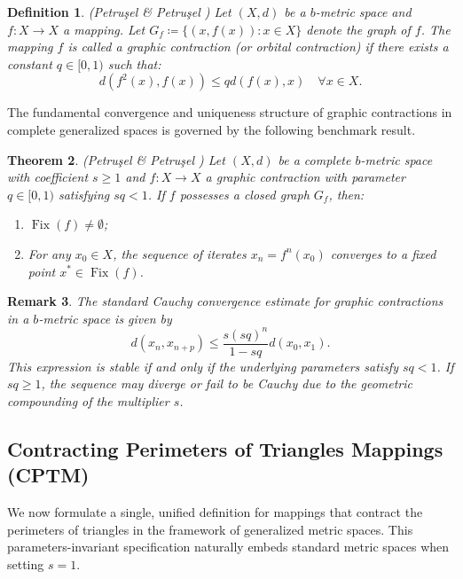 \documentclass[a4paper,12pt,oneside]{article}
\newtheorem{theorem}{Theorem}[section]
\newtheorem{definition}[theorem]{Definition}
\newtheorem{remark}[theorem]{Remark}
\numberwithin{equation}{section}
\begin{document}
\begin{definition}
\label{def:graphic}
(Petruşel \& Petruşel \cite{petrusel2023}) Let $(X,d)$ be a $b$-metric space and $f:X\to X$ a mapping. Let $G_{f}\coloneqq \{(x,f(x)):x\in X\}$ denote the graph of $f$. The mapping $f$ is called a \emph{graphic contraction} (or orbital contraction) if there exists a constant $q\in [0,1)$ such that:
\begin{equation}
d(f^{2}(x),f(x))\leq qd(f(x),x)\quad \forall x\in X.
\label{eq:graphic_def}
\end{equation}
\end{definition}

The fundamental convergence and uniqueness structure of graphic contractions in complete generalized spaces is governed by the following benchmark result.

\begin{theorem}
\label{thm:graphic_basic}
(Petruşel \& Petruşel \cite{petrusel2023}) Let $(X,d)$ be a complete $b$-metric space with coefficient $s\geq 1$ and $f:X\to X$ a graphic contraction with parameter $q\in [0,1)$ satisfying $sq< 1$. If $f$ possesses a closed graph $G_f$, then:
\begin{enumerate}
\item $\operatorname{Fix}(f)\neq \emptyset$;
\item For any $x_0\in X$, the sequence of iterates $x_n = f^n (x_0)$ converges to a fixed point $x^*\in \operatorname{Fix}(f)$.
\end{enumerate}
\end{theorem}

\begin{remark}
The standard Cauchy convergence estimate for graphic contractions in a $b$-metric space is given by
\begin{equation}
d(x_{n},x_{n + p})\leq \frac{s(sq)^{n}}{1 - sq} d(x_{0},x_{1}).
\label{eq:cauchy_estimate}
\end{equation}
This expression is stable if and only if the underlying parameters satisfy $sq< 1$. If $sq\geq 1$, the sequence may diverge or fail to be Cauchy due to the geometric compounding of the multiplier $s$.
\end{remark}

\subsection{Contracting Perimeters of Triangles Mappings (CPTM)}
We now formulate a single, unified definition for mappings that contract the perimeters of triangles in the framework of generalized metric spaces. This parameters-invariant specification naturally embeds standard metric spaces when setting $s = 1$.
\end{document}
